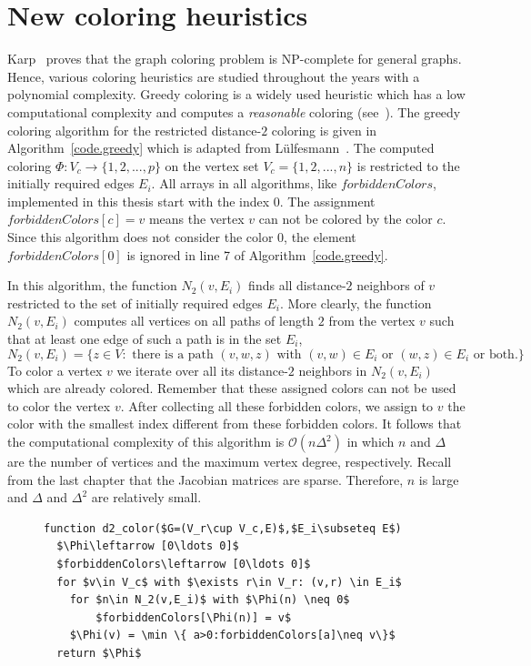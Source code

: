 \documentclass[12pt, twoside,a4paper,toc=bibliography]{scrbook}
\newcommand{\coderef}[1]{Algorithm~\protect\ref{#1}}
\begin{document}
\chapter{New coloring heuristics}
\label{package}
Karp~\cite{karp:1972} proves that the graph coloring problem is NP-complete for general graphs.
Hence, various coloring heuristics are studied throughout the years with a polynomial complexity.
Greedy coloring is a widely used heuristic which has a low computational complexity
and computes a \textit{reasonable} coloring (see~\cite{spaa14}).
The greedy coloring algorithm for the restricted distance-$2$ coloring
is given in \coderef{code.greedy} which is adapted from Lülfesmann~\cite{Lulfesmann2012Fap}.
The computed coloring $\Phi:V_c\to\{1,2,...,p\}$ on the vertex set $V_c=\{1,2,...,n\}$
is restricted to the initially required edges $E_i$.
All arrays in all algorithms, like $forbiddenColors$,
implemented in this thesis start with the index $0$.
The assignment $forbiddenColors[c]=v$ means the vertex $v$ can not be colored
by the color $c$. Since this algorithm does not consider the color $0$,
the element $forbiddenColors[0]$ is ignored in line 7 of \coderef{code.greedy}.

In this algorithm, the function $N_2(v,E_i)$ finds all distance-$2$ neighbors
of $v$ restricted to the set of initially required edges $E_i$.
More clearly, the function $N_2(v,E_i)$ computes
all vertices on all paths of length $2$ from the vertex $v$
such that at least one edge of such a path is in the set $E_i$,
$$
N_2(v,E_i)=\{ z\in V: \text{ there is a path } (v,w,z) \text{ with } (v,w)\in E_i
\text{ or } (w,z)\in E_i \text{ or both.}\}
$$
To color a vertex $v$ we iterate over all its distance-$2$ neighbors in $N_2(v,E_i)$ which are
already colored. Remember that these assigned colors can not be used to color the vertex $v$.
After collecting all these forbidden colors, we assign to $v$ the color with the smallest index different from
these forbidden colors.
It follows that the computational complexity of this algorithm is $\mathcal{O}(n \Delta^2)$ in which $n$
and $\Delta$ are the number of vertices and the maximum vertex degree, respectively.
Recall from the last chapter that the Jacobian matrices are sparse. Therefore, $n$ is large and $\Delta$ and $\Delta^2$
are relatively small.

\begin{figure}
\begin{lstlisting}[caption=The greedy algorithm for
the distance-$2$ coloring restricted to the edge set $E_i$
for columns.,label=code.greedy,mathescape]
function d2_color($G=(V_r\cup V_c,E)$,$E_i\subseteq E$)
  $\Phi\leftarrow [0\ldots 0]$
  $forbiddenColors\leftarrow [0\ldots 0]$
  for $v\in V_c$ with $\exists r\in V_r: (v,r) \in E_i$
    for $n\in N_2(v,E_i)$ with $\Phi(n) \neq 0$
        $forbiddenColors[\Phi(n)] = v$
    $\Phi(v) = \min \{ a>0:forbiddenColors[a]\neq v\}$
  return $\Phi$
\end{lstlisting}
\end{figure}
\end{document}
